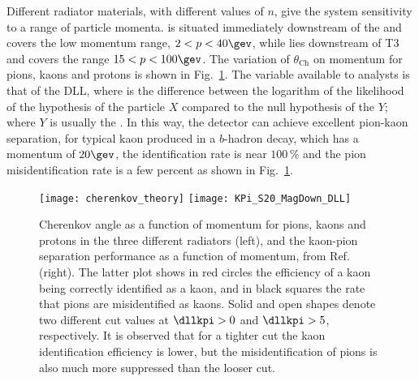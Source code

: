 Different radiator materials, with different values of $n$, give the \rich system sensitivity to a
range of particle momenta.
\richone is situated immediately downstream of the \velo and covers the low momentum range,
$2<p<40\gev$, while \richtwo lies downstream of T3 and covers the range $15<p<100\gev$.
The variation of $\theta_\mathrm{Ch}$ on momentum for pions, kaons and protons is shown in
Fig.~\ref{fig:lhcb:pideff}.
The variable available to analysts is that of the \gls{DLL}, where \dllxy is the difference between the
logarithm of the likelihood of the hypothesis of the particle $X$ compared to the null hypothesis of the
$Y$; where $Y$ is usually the \pion.
In this way, the \lhcb detector can achieve excellent pion-kaon separation, for typical kaon
produced in a $b$-hadron decay, which has a
momentum of \approx$20\gev$, the identification rate is near $100\,\%$ and the pion misidentification
rate is a few percent as shown in Fig.~\ref{fig:lhcb:pideff}.

\begin{figure}
  \begin{center}
    \texttt{[image: cherenkov\_theory]}
    \texttt{[image: KPi\_S20\_MagDown\_DLL]}
  \end{center}
  \caption[Particle identification and Cherenkov angles]
  {
    Cherenkov angle as a function of momentum for pions, kaons and protons in the three different
    radiators (left), and the kaon-pion separation performance as a function of momentum, from
    Ref.~\cite{LHCb-DP-2012-003} (right).
    The latter plot shows in red circles the efficiency of a kaon being correctly identified as a
    kaon, and
    in black squares the rate that pions are misidentified as kaons.
    Solid and open shapes denote two different cut values at $\dllkpi>0$ and $\dllkpi>5$,
    respectively.
    It is observed that for a tighter cut the kaon identification efficiency is lower, but the
    misidentification of pions is also much more suppressed than the looser cut.
  }
  \label{fig:lhcb:pideff}
\end{figure}




